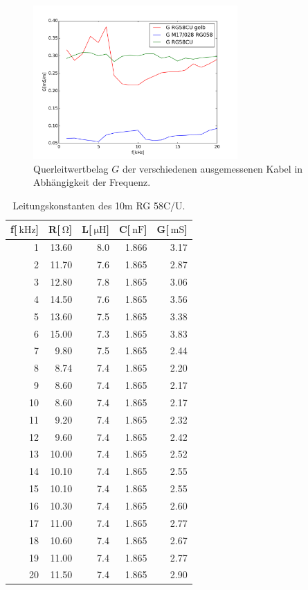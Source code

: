 \begin{figure}
\begin{minipage}{7.8cm}
	\end{minipage}
	\begin{minipage}{7.8cm}
		\includegraphics[width = 7.8cm]{data/a/G.pdf}
		\caption[]{Querleitwertbelag $G$ der verschiedenen ausgemessenen Kabel in Abhängigkeit der Frequenz.}
		\label{fig_konst4}
	\end{minipage}
\end{figure}

\begin{table}
\centering
	\caption[]{Leitungskonstanten des 10m RG 58C/U.}
	\begin{tabular}{r r r r r}
		\toprule
		f[$\SI{}{\kilo\hertz}$] & R[$\SI{}{\ohm}$] & L[$\SI{}{\micro\henry}$] & C[$\SI{}{\nano \farad}$] & G[$\SI{}{\milli\siemens}$]\\
		\midrule
		  1	&	13.60	&	8.0	&	1.866	&	3.17\\
		  2	&	11.70	&	7.6	&	1.865	&	2.87\\
		  3	&	12.80	&	7.8	&	1.865	&	3.06\\
		  4	&	14.50	&	7.6	&	1.865	&	3.56\\
		  5	&	13.60	&	7.5	&	1.865	&	3.38\\
		  6	&	15.00	&	7.3	&	1.865	&	3.83\\
		  7	&	 9.80	&	7.5	&	1.865	&	2.44\\
		  8	&	 8.74	&	7.4	&	1.865	&	2.20\\
		  9	&	 8.60	&	7.4	&	1.865	&	2.17\\
		 10	&	 8.60	&	7.4	&	1.865	&	2.17\\
		 11	&	 9.20	&	7.4	&	1.865	&	2.32\\
		 12	&	 9.60	&	7.4	&	1.865	&	2.42\\
		 13	&	10.00	&	7.4	&	1.865	&	2.52\\
		 14	&	10.10	&	7.4	&	1.865	&	2.55\\
		 15	&	10.10	&	7.4	&	1.865	&	2.55\\
		 16	&	10.30	&	7.4	&	1.865	&	2.60\\
		 17	&	11.00	&	7.4	&	1.865	&	2.77\\
		 18	&	10.60	&	7.4	&	1.865	&	2.67\\
		 19	&	11.00	&	7.4	&	1.865	&	2.77\\
		 20	&	11.50	&	7.4	&	1.865	&	2.90\\
		\bottomrule
	\end{tabular}
	\label{tab_konst1}
\end{table}

